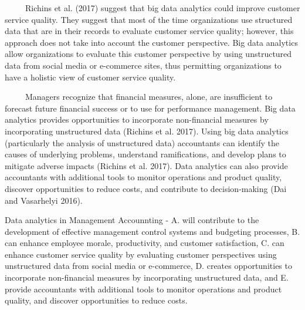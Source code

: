 \documentclass[
  letterpaper,
  DIV=11,
  numbers=noendperiod]{scrreprt}
\begin{document}
~~~~~Richins et al. (2017) suggest that big data analytics could improve
customer service quality. They suggest that most of the time
organizations use structured data that are in their records to evaluate
customer service quality; however, this approach does not take into
account the customer perspective. Big data analytics allow organizations
to evaluate this customer perspective by using unstructured data from
social media or e-commerce sites, thus permitting organizations to have
a holistic view of customer service quality.

~~~~~Managers recognize that financial measures, alone, are insufficient
to forecast future financial success or to use for performance
management. Big data analytics provides opportunities to incorporate
non-financial measures by incorporating unstructured data (Richins et
al. 2017). Using big data analytics (particularly the analysis of
unstructured data) accountants can identify the causes of underlying
problems, understand ramifications, and develop plans to mitigate
adverse impacts (Richins et al. 2017). Data analytics can also provide
accountants with additional tools to monitor operations and product
quality, discover opportunities to reduce costs, and contribute to
decision-making (Dai and Vasarhelyi 2016).

\begin{tcolorbox}[enhanced jigsaw, arc=.35mm, bottomrule=.15mm, bottomtitle=1mm, breakable, colback=white, colbacktitle=quarto-callout-caution-color!10!white, colframe=quarto-callout-caution-color-frame, coltitle=black, left=2mm, leftrule=.75mm, opacityback=0, opacitybacktitle=0.6, rightrule=.15mm, title=\textcolor{quarto-callout-caution-color}{\faFire}\hspace{0.5em}{Summary Point}, titlerule=0mm, toprule=.15mm, toptitle=1mm]

Data analytics in Management Accounnting - A. will contribute to the
development of effective management control systems and budgeting
processes, B. can enhance employee morale, productivity, and customer
satisfaction, C. can enhance customer service quality by evaluating
customer perspectives using unstructured data from social media or
e-commerce, D. creates opportunities to incorporate non-financial
measures by incorporating unstructured data, and E. provide accountants
with additional tools to monitor operations and product quality, and
discover opportunities to reduce costs.

\end{tcolorbox}
\end{document}
